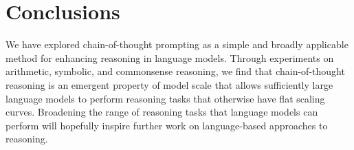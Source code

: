 \section{Conclusions}
We have explored chain-of-thought prompting as a simple and broadly applicable method for enhancing reasoning in language models. 
Through experiments on arithmetic, symbolic, and commonsense reasoning, we find that chain-of-thought reasoning is an emergent property of model scale that allows sufficiently large language models to perform reasoning tasks that otherwise have flat scaling curves.
Broadening the range of reasoning tasks that language models can perform will hopefully inspire further work on language-based approaches to reasoning. 

\clearpage



